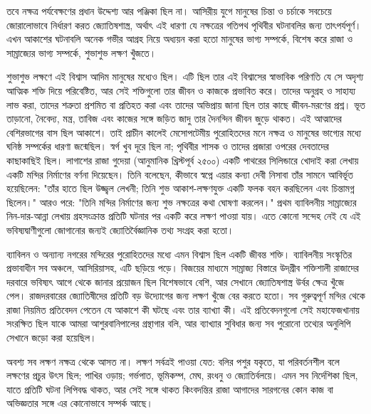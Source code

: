 তবে নক্ষত্র পর্যবেক্ষণের প্রধান উদ্দেশ্য আর পঞ্জিকা ছিল না। আসিরীয় যুগে মানুষের চিন্তা ও চর্চাকে সবচেয়ে জোরালোভাবে নির্ধারণ করত জ্যোতিষশাস্ত্র, অর্থাৎ এই ধারণা যে নক্ষত্রের গতিপথ পৃথিবীর ঘটনাবলির জন্য তাৎপর্যপূর্ণ। এখন আকাশের ঘটনাবলি অনেক গভীর আগ্রহ নিয়ে অধ্যয়ন করা হতো মানুষের ভাগ্য সম্পর্কে, বিশেষ করে রাজা ও সাম্রাজ্যের ভাগ্য সম্পর্কে, শুভাশুভ লক্ষণ খুঁজতে।

শুভাশুভ লক্ষণে এই বিশ্বাস আদিম মানুষের মধ্যেও ছিল। এটি ছিল তার এই বিশ্বাসের স্বাভাবিক পরিণতি যে সে অদৃশ্য আত্মিক শক্তি দিয়ে পরিবেষ্টিত, আর সেই শক্তিগুলো তার জীবন ও কাজকে প্রভাবিত করে। তাদের অনুগ্রহ ও সাহায্য লাভ করা, তাদের শত্রুতা প্রশমিত বা প্রতিহত করা এবং তাদের অভিপ্রায় জানা ছিল তার কাছে জীবন-মরণের প্রশ্ন। ভূত তাড়ানো, নৈবেদ্য, মন্ত্র, তাবিজ এবং কাজের সঙ্গে জড়িত জাদু তার দৈনন্দিন জীবন জুড়ে থাকত। এই আত্মাদের বেশিরভাগের বাস ছিল আকাশে। তাই প্রাচীন কালেই মেসোপটেমীয় পুরোহিতদের মনে নক্ষত্র ও মানুষের ভাগ্যের মধ্যে ঘনিষ্ঠ সম্পর্কের ধারণা জন্মেছিল। স্বর্গ খুব দূরে ছিল না; পৃথিবীর শাসক ও তাদের প্রজারা ওপরের দেবতাদের কাছাকাছিই ছিল। লাগাশের রাজা গুদেয়া (আনুমানিক খ্রিস্টপূর্ব ২৫০০) একটি পাথরের সিলিন্ডারে খোদাই করা লেখায় একটি মন্দির নির্মাণের বর্ণনা দিয়েছেন। তিনি বলেছেন, কীভাবে স্বপ্নে এয়ার কন্যা দেবী নিসাবা তাঁর সামনে আবির্ভূত হয়েছিলেন: "তাঁর হাতে ছিল উজ্জ্বল লেখনী; তিনি শুভ আকাশ-লক্ষণযুক্ত একটি ফলক বহন করছিলেন এবং চিন্তামগ্ন ছিলেন।" আরও পরে: "তিনি মন্দির নির্মাণের জন্য শুভ নক্ষত্রের কথা ঘোষণা করলেন।" প্রথম ব্যাবিলনীয় সাম্রাজ্যের নিন-দার-আন্না লেখায় গ্রহসংক্রান্ত প্রতিটি ঘটনার পর একটি করে লক্ষণ পাওয়া যায়। এতে কোনো সন্দেহ নেই যে এই ভবিষ্যদ্বাণীগুলো জোগানোর জন্যই জ্যোতির্বৈজ্ঞানিক তথ্য সংগ্রহ করা হতো।

ব্যাবিলন ও অন্যান্য নগরের মন্দিরের পুরোহিতদের মধ্যে এমন বিশ্বাস ছিল একটি জীবন্ত শক্তি। ব্যাবিলনীয় সংস্কৃতির প্রভাবাধীন সব অঞ্চলে, আসিরিয়াসহ, এটি ছড়িয়ে পড়ে। বিজয়ের মাধ্যমে সাম্রাজ্য বিস্তারে উদ্‌গ্রীব শক্তিশালী রাজাদের দরবারে ভবিষ্যৎ আগে থেকে জানার প্রয়োজন ছিল বিশেষভাবে বেশি, আর সেখানে জ্যোতিষশাস্ত্র উর্বর ক্ষেত্র খুঁজে পেল। রাজদরবারের জ্যোতিষীদের প্রতিটি বড় উদ্যোগের জন্য লক্ষণ খুঁজে বের করতে হতো। সব গুরুত্বপূর্ণ মন্দির থেকে রাজা নিয়মিত প্রতিবেদন পেতেন যে আকাশে কী ঘটছে এবং তার ব্যাখ্যা কী। এই প্রতিবেদনগুলো সেই মহাফেজখানায় সংরক্ষিত ছিল যাকে আমরা আশুরবানিপালের গ্রন্থাগার বলি, আর ব্যাখ্যার সুবিধার জন্য সব পুরোনো তথ্যের অনুলিপি সেখানে জড়ো করা হয়েছিল।

অবশ্য সব লক্ষণ নক্ষত্র থেকে আসত না। লক্ষণ সর্বত্রই পাওয়া যেত: বলির পশুর যকৃতে, যা পরিবর্তনশীল বলে লক্ষণের প্রচুর উৎস ছিল; পাখির ওড়ায়; গর্ভপাত, ভূমিকম্প, মেঘ, রংধনু ও জ্যোতির্বলয়ে। এমন সব নির্দেশিকা ছিল, যাতে প্রতিটি ঘটনা লিপিবদ্ধ থাকত, আর সেই সঙ্গে থাকত কিংবদন্তির রাজা আগাদের সারগনের কোন কাজ বা অভিজ্ঞতার সঙ্গে এর কোনোভাবে সম্পর্ক আছে।

